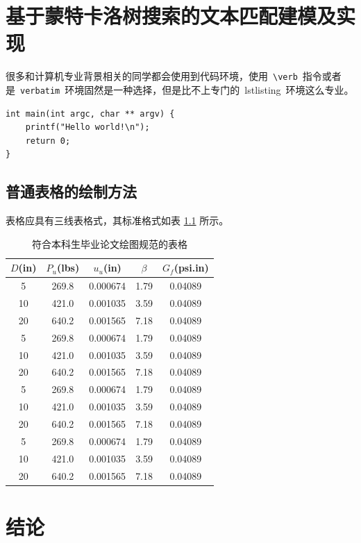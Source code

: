 \chapter{基于蒙特卡洛树搜索的文本匹配建模及实现}

很多和计算机专业背景相关的同学都会使用到代码环境，使用~\verb|\verb|~指令或者是~\verb|verbatim|~环境固然是一种选择，但是比不上专门的~lstlisting~环境这么专业。

\begin{lstlisting}
int main(int argc, char ** argv) {
    printf("Hello world!\n");
    return 0;
}
\end{lstlisting}

\section{普通表格的绘制方法}

表格应具有三线表格式，其标准格式如表 \ref{tab:table1} 所示。
\begin{table}[htbp]
\caption{符合本科生毕业论文绘图规范的表格}\label{tab:table1}
\vspace{0.5em}\centering\wuhao
\begin{tabular}{ccccc}
\toprule[1.5pt]
$D$(in) & $P_u$(lbs) & $u_u$(in) & $\beta$ & $G_f$(psi.in)\\
\midrule[1pt]
 5 & 269.8 & 0.000674 & 1.79 & 0.04089\\
10 & 421.0 & 0.001035 & 3.59 & 0.04089\\
20 & 640.2 & 0.001565 & 7.18 & 0.04089\\
 5 & 269.8 & 0.000674 & 1.79 & 0.04089\\
10 & 421.0 & 0.001035 & 3.59 & 0.04089\\
20 & 640.2 & 0.001565 & 7.18 & 0.04089\\
 5 & 269.8 & 0.000674 & 1.79 & 0.04089\\
10 & 421.0 & 0.001035 & 3.59 & 0.04089\\
20 & 640.2 & 0.001565 & 7.18 & 0.04089\\
 5 & 269.8 & 0.000674 & 1.79 & 0.04089\\
10 & 421.0 & 0.001035 & 3.59 & 0.04089\\
20 & 640.2 & 0.001565 & 7.18 & 0.04089\\
\bottomrule[1.5pt]
\end{tabular}
\vspace{\baselineskip}
\end{table}



\chapter*{结\quad 论}
